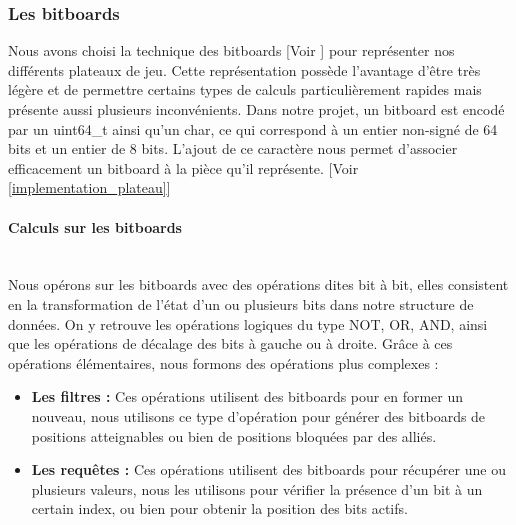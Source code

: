 \huge\documentclass{article}
\begin{document}
\subsubsection{Les bitboards}
Nous avons choisi la technique des bitboards [Voir \cite{Bitboards}] pour représenter nos différents plateaux de jeu.
Cette représentation possède l'avantage d'être très légère et de permettre certains types de calculs particulièrement rapides mais présente aussi plusieurs inconvénients.
Dans notre projet, un bitboard est encodé par un uint64\_t ainsi qu'un char, ce qui correspond à un entier non-signé de 64 bits et un entier de 8 bits.
L'ajout de ce caractère nous permet d'associer efficacement un bitboard à la pièce qu'il représente. [Voir \ref{implementation_plateau}]
\paragraph{Calculs sur les bitboards} \label{calculs_sur_les_bitboards}
~~\\
Nous opérons sur les bitboards avec des opérations dites bit à bit, elles consistent en la transformation de l'état d'un ou plusieurs bits dans notre structure de données.
On y retrouve les opérations logiques du type NOT, OR, AND, ainsi que les opérations de décalage des bits à gauche ou à droite.
Grâce à ces opérations élémentaires, nous formons des opérations plus complexes :
\begin{itemize}
    \item \textbf{Les filtres : }
    Ces opérations utilisent des bitboards pour en former un nouveau, nous utilisons ce type d'opération pour générer des bitboards de positions atteignables ou bien de positions bloquées par des alliés. 
    \item \textbf{Les requêtes : }
    Ces opérations utilisent des bitboards pour récupérer une ou plusieurs valeurs, nous les utilisons pour vérifier la présence d'un bit à un certain index, ou bien pour obtenir la position des bits actifs.
\end{itemize}
\end{document}

